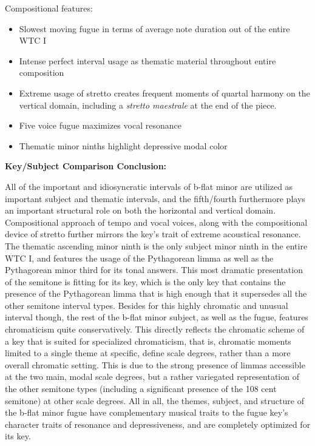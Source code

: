 Compositional features:

\begin{itemize}
\tightlist
\item
  Slowest moving fugue in terms of average note duration out of the
  entire WTC I
\item
  Intense perfect interval usage as thematic material throughout entire
  composition
\item
  Extreme usage of stretto creates frequent moments of quartal harmony
  on the vertical domain, including a \emph{stretto maestrale} at the
  end of the piece.
\item
  Five voice fugue maximizes vocal resonance
\item
  Thematic minor ninths highlight depressive modal color
\end{itemize}

\textbf{Key/Subject Comparison Conclusion:}

All of the important and idiosyncratic intervals of b-flat minor are
utilized as important subject and thematic intervals, and the
fifth/fourth furthermore plays an important structural role on both the
horizontal and vertical domain. Compositional approach of tempo and
vocal voices, along with the compositional device of stretto further
mirrors the key's trait of extreme acoustical resonance. The thematic
ascending minor ninth is the only subject minor ninth in the entire WTC
I, and features the usage of the Pythagorean limma as well as the
Pythagorean minor third for its tonal answers. This most dramatic
presentation of the semitone is fitting for its key, which is the only
key that contains the presence of the Pythagorean limma that is high
enough that it supersedes all the other semitone interval types. Besides
for this highly chromatic and unusual interval though, the rest of the
b-flat minor subject, as well as the fugue, features chromaticism quite
conservatively. This directly reflects the chromatic scheme of a key
that is suited for specialized chromaticism, that is, chromatic moments
limited to a single theme at specific, define scale degrees, rather than
a more overall chromatic setting. This is due to the strong presence of
limmas accessible at the two main, modal scale degrees, but a rather
variegated representation of the other semitone types (including a
significant presence of the 108 cent semitone) at other scale degrees.
All in all, the themes, subject, and structure of the b-flat minor fugue
have complementary musical traits to the fugue key's character traits of
resonance and depressiveness, and are completely optimized for its key.

